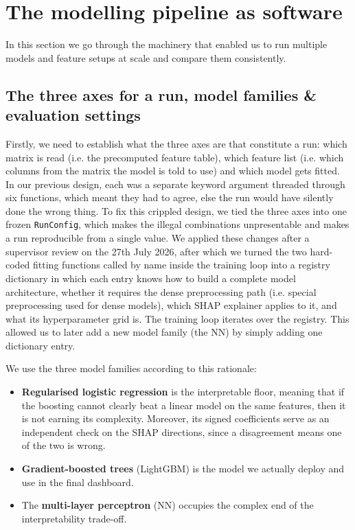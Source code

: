 \documentclass[    author={Samuel Menon Demelo; Sneha Saphala Ram Prasad; 
Viktor Ander Lindholm; Vishal Khatri},
               supervisor={Prof. Fernando Moreno-Pino},
                   degree={MSc},
                    title={Lloyds Commercial Banking Intelligence},
                 subtitle={Ranking SME Lending, Risk and Growth Prospects for Lloyds Banking Group},
                     type={},
                     year={2026}]{dissertation}
\begin{document}
\section{The modelling pipeline as software}
\label{sec:pipeline}
In this section we go through the machinery that enabled us to run multiple models and feature setups at scale and compare them consistently.

\subsection{The three axes for a run, model families \& evaluation settings}
Firstly, we need to establish what the three axes are that constitute a run: which matrix is read (i.e. the precomputed feature table), which feature list (i.e. which columns from the matrix the model is told to use) and which model gets fitted. In our previous design, each was a separate keyword argument threaded through six functions, which meant they had to agree, else the run would have silently done the wrong thing. To fix this crippled design, we tied the three axes into one frozen \texttt{RunConfig}, which makes the illegal combinations unpresentable and makes a run reproducible from a single value. We applied these changes after a supervisor review on the 27th July 2026, after which we turned the two hard-coded fitting functions called by name inside the training loop into a registry dictionary in which each entry knows how to build a complete model architecture, whether it requires the dense preprocessing path (i.e. special preprocessing used for dense models), which SHAP explainer applies to it, and what its hyperparameter grid is. The training loop iterates over the registry. This allowed us to later add a new model family (the NN) by simply adding one dictionary entry.

We use the three model families according to this rationale:
\begin{itemize}
    \item \textbf{Regularised logistic regression} is the interpretable floor, meaning that if the boosting cannot clearly beat a linear model on the same features, then it is not earning its complexity. Moreover, its signed coefficients serve as an independent check on the SHAP directions, since a disagreement means one of the two is wrong.
    \item \textbf{Gradient-boosted trees} (LightGBM)\cite{ke2017lightgbm} is the model we actually deploy and use in the final dashboard.
    \item The \textbf{multi-layer perceptron} (NN) occupies the complex end of the interpretability trade-off.
\end{itemize}
\end{document}
